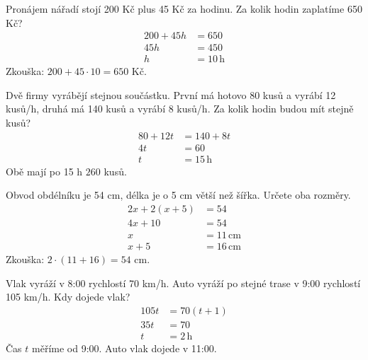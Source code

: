 \documentclass[11pt,a4paper]{article}
\begin{document}
\begin{zadaniReseniBox}[title={Samostatná práce 1}]
Pronájem nářadí stojí 200 Kč plus 45 Kč za hodinu. Za kolik hodin zaplatíme 650 Kč?
\tcblower
\[\begin{aligned}
200+45h&=650 \\
45h&=450 \\
h&=10\,\mathrm h
\end{aligned}\]
Zkouška: $200+45\cdot10=650$ Kč.
\end{zadaniReseniBox}
\begin{zadaniReseniBox}[title={Samostatná práce 2}]
Dvě firmy vyrábějí stejnou součástku. První má hotovo 80 kusů a vyrábí 12 kusů/h, druhá má 140 kusů a vyrábí 8 kusů/h. Za kolik hodin budou mít stejně kusů?
\tcblower
\[\begin{aligned}
80+12t&=140+8t \\
4t&=60 \\
t&=15\,\mathrm h
\end{aligned}\]
Obě mají po 15 h $260$ kusů.
\end{zadaniReseniBox}
\begin{zadaniReseniBox}[title={Samostatná práce 3}]
Obvod obdélníku je 54 cm, délka je o 5 cm větší než šířka. Určete oba rozměry.
\tcblower
\[\begin{aligned}
2x+2(x+5)&=54 \\
4x+10&=54 \\
x&=11\,\mathrm{cm} \\
x+5&=16\,\mathrm{cm}
\end{aligned}\]
Zkouška: $2\cdot(11+16)=54$ cm.
\end{zadaniReseniBox}
\begin{zadaniReseniBox}[title={Rozšíření 1}]
Vlak vyráží v 8:00 rychlostí 70 km/h. Auto vyráží po stejné trase v 9:00 rychlostí 105 km/h. Kdy dojede vlak?
\tcblower
\[\begin{aligned}
105t&=70(t+1) \\
35t&=70 \\
t&=2\,\mathrm h
\end{aligned}\]
Čas $t$ měříme od 9:00. Auto vlak dojede v 11:00.
\end{zadaniReseniBox}
\end{document}
